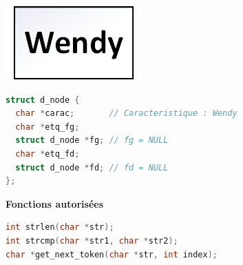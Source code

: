 \documentclass[11pt,a4paper]{article}
\begin{document}
\vspace*{-1.0cm}

\begin{table}[ht!]
  \centering
  \begin{minipage}{0.30\textwidth}
    \centering

\begin{center}
\includegraphics[scale=0.80]{img/DecisionTree_Node_name.png}
\end{center}

  \end{minipage}
  \hfillx
  \begin{minipage}{0.70\textwidth}
    \centering

\begin{lstlisting}[language=C,commentstyle=\color{commentgreen}]
struct d_node {
  char *carac;       // Caracteristique : Wendy
  char *etq_fg;
  struct d_node *fg; // fg = NULL
  char *etq_fd;
  struct d_node *fd; // fd = NULL
}; \end{lstlisting}

  \end{minipage}
\end{table}

\vspace*{-0.5cm}


\noindent \textbf{Fonctions autorisées}

\medskip

\begin{lstlisting}[language=C,commentstyle=\color{commentgreen}]
int strlen(char *str);
int strcmp(char *str1, char *str2);
char *get_next_token(char *str, int index);
\end{lstlisting}

\vspace*{-0.5cm}
\end{document}
